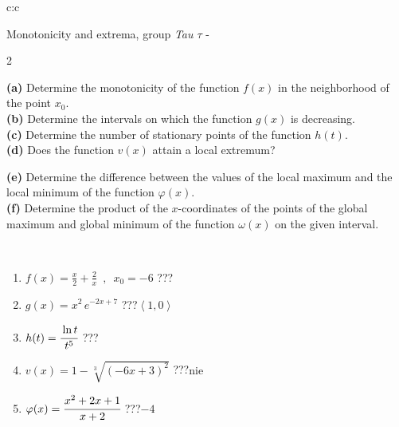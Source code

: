 \documentclass[10pt]{report}
\begin{document}
\begin{tabular}{c:c}
\begin{minipage}[c][104.5mm][t]{0.5\linewidth}
\begin{center}
\vspace{5mm}
{\huge Monotonicity and extrema, group \textit{Tau $\tau$} -}\\[5mm]
\begin{minipage}{0.95\linewidth}
\begin{center}
{\small \begin{multicols}{2} \raggedright
\textbf{(a)} Determine the monotonicity of the function \(f(x)\) in the neighborhood of the point \(x_0\). \\[1mm]
\textbf{(b)} Determine the intervals on which the function \(g(x)\) is decreasing. \\[1mm]
\textbf{(c)} Determine the number of stationary points of the function \(h(t)\). \\[1mm]
\textbf{(d)} Does the function \(v(x)\) attain a local extremum? \par \columnbreak
\textbf{(e)} Determine the difference between the values of the local maximum and the local minimum of the function \(\varphi(x)\). \\[1mm]
\textbf{(f)} Determine the product of the \(x\)-coordinates of the points of the global maximum and global minimum of the function \(\omega(x)\) on the given interval. \\[1mm]
\end{multicols}
}
\end{center}
\end{minipage}
\\[1mm]
\begin{minipage}{0.79\linewidth}
\begin{center}
\begin{varwidth}{\linewidth}
\setlength{\itemsep}{0pt}
\begin{enumerate}
\normalsize
\item $f(x)=\frac{x}{2}+\frac{2}{x} \enspace , \enspace x_0=-6$\quad \dotfill\; ???\;\dotfill \quad {}
\item $g(x)=x^2\, e^{-2x+7}$\quad \dotfill\; ???\;\dotfill \quad $\left\langle1 , 0\right\rangle$
\item $h(t)=\cfrac{\ln t}{t^5}$\quad \dotfill\; ???\;\dotfill {}
\item $v(x)=1-\sqrt[3]{(-6x+3)^2}$\quad \dotfill\; ???\;\dotfill \quad $\text{nie}$
\item $\varphi(x)=\cfrac{x^2+2x+1}{x+2}$\quad \dotfill\; ???\;\dotfill \quad $-4$

\end{enumerate}
\end{varwidth}
\end{center}
\end{minipage}
\end{center}
\end{minipage}
\end{tabular}
\end{document}
